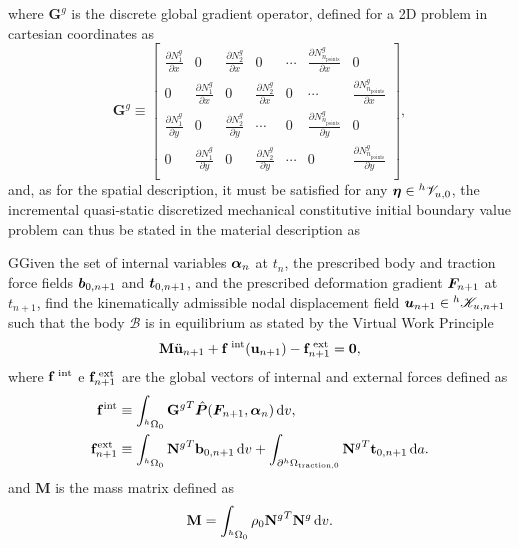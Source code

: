 where $\mathbf G^g$ is the discrete global gradient operator, defined for a 2D problem in cartesian coordinates as
\begin{equation}
    \mathbf G^g\equiv \left[
    \begin{array}{ccccccc}
         \displaystyle{\frac{\partial N_1^g}{\partial x}} & 0 & \displaystyle{\frac{\partial N_2^g}{\partial x}} & 0 & \cdots &
         \displaystyle{\frac{\partial N_{n_\text{points}}^g}{\partial x}} & 0\\
         0 & \displaystyle{\frac{\partial N_1^g}{\partial x}} & 0 & \displaystyle{\frac{\partial N_2^g}{\partial x}} & 0 & \cdots &
         \displaystyle{\frac{\partial N_{n_\text{points}}^g}{\partial x}}\\
         \displaystyle{\frac{\partial N_1^g}{\partial y}} & 0 & \displaystyle{\frac{\partial N_2^g}{\partial y}} & \cdots &
         0 & \displaystyle{\frac{\partial N_{n_\text{points}}^g}{\partial y}} & 0\\
         0 & \displaystyle{\frac{\partial N_1^g}{\partial y}} & 0 & \displaystyle{\frac{\partial N_2^g}{\partial y}} & \cdots &
         0 & \displaystyle{\frac{\partial N_{n_\text{points}}^g}{\partial y}}\\
    \end{array}
    \right],
\end{equation}
and, as for the spatial description, it must  be satisfied for any $\bm{\eta} \in {}^h\mathscr{V}_{u,0}$, the incremental quasi-static discretized mechanical constitutive initial boundary value problem can thus be stated in the material description as
\begin{problem}
GGiven the set of internal variables $\bm{\alpha}_n$ at $t_n$, the prescribed body and traction force fields $\bm{b}_{0,n+1}$ and $\bm{t}_{0,n+1}$, and the prescribed deformation gradient $\bm{F}_{n+1}$ at $t_{n+1}$, find the kinematically admissible nodal displacement field $\bm{u}_{n+1}\in {^h\mathscr{K}_{u,n+1}}$ such that the body $\mathscr{B}$ is in equilibrium as stated by the Virtual Work Principle
\begin{equation}
    \mathbf M \ddot{\mathbf u}_{n+1} +\mathbf f^\text{\;int}(\mathbf u_{n+1})-\mathbf f^\text{\;ext}_{n+1}=\mathbf 0, \label{eq:equilibrium_material}
\end{equation}
where $\mathbf f^\text{\;int}$ e $\mathbf f^\text{\;ext}_{n+1}$ are the global vectors of internal and external forces defined as
\begin{align}
    \mathbf f^\text{int} &\equiv \int_{^h\Omega_0}{\mathbf G^g}^T \hat{\bm{P}}(\bm{F}_{n+1}, \bm{\alpha}_n)\,\mathrm{d} v,\\
    \mathbf f^\text{ext}_{n+1} &\equiv \int_{^h\Omega_0}{\mathbf N^g}^T \mathbf b_{0,n+1}\,\mathrm{d} v + \int_{\partial^h\Omega_\text{traction,0}}{\mathbf N^g}^T \mathbf t_{0,n+1}\,\mathrm{d} a.
\end{align}
and $\mathbf M$ is the mass matrix defined as
\begin{equation}
  \mathbf M = \int_{{}^h\Omega_0} \rho_0 {\mathbf{N}^g}^T\mathbf{N}^g \,\mathrm{d} v.
\end{equation}
\end{problem}

